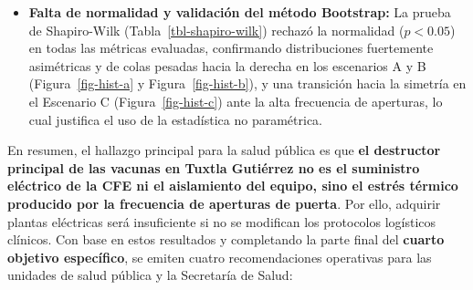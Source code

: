 \documentclass[
  spanish,
  us-letterpaper,
]{scrreprt}
\numberwithin{equation}{section}
\theoremstyle{plain}
\theoremstyle{plain}
\theoremstyle{definition}
\theoremstyle{plain}
\theoremstyle{remark}
\begin{document}
\begin{itemize}
  lineal sino exponencial, multiplicándose por más de cinco veces hasta
  alcanzar \textbf{1,905 dosis destruidas por año (2.57\%)} con un IC al
  \(95\%\) de \([1896, 1913]\text{ dosis}\) (\([2.56\%, 2.58\%]\),
  Tabla~\ref{tbl-riesgo-operativo-bootstrap}, Figura~\ref{fig-boot-c} y
  Figura~\ref{fig-box-boot-c}), produciendo un daño continuo durante
  todo el año sin importar la estación climática
  (Figura~\ref{fig-abanico-c}, Figura~\ref{fig-promedio-c},
  Figura~\ref{fig-mediana-c}, Figura~\ref{fig-hist-c} y
  Figura~\ref{fig-boxplot-c}).
\item
  \textbf{Falta de normalidad y validación del método Bootstrap:} La
  prueba de Shapiro-Wilk (Tabla~\ref{tbl-shapiro-wilk}) rechazó la
  normalidad (\(p < 0.05\)) en todas las métricas evaluadas, confirmando
  distribuciones fuertemente asimétricas y de colas pesadas hacia la
  derecha en los escenarios A y B (Figura~\ref{fig-hist-a} y
  Figura~\ref{fig-hist-b}), y una transición hacia la simetría en el
  Escenario C (Figura~\ref{fig-hist-c}) ante la alta frecuencia de
  aperturas, lo cual justifica el uso de la estadística no paramétrica.
\end{itemize}

En resumen, el hallazgo principal para la salud pública es que
\textbf{el destructor principal de las vacunas en Tuxtla Gutiérrez no es
el suministro eléctrico de la CFE ni el aislamiento del equipo, sino el
estrés térmico producido por la frecuencia de aperturas de puerta}. Por
ello, adquirir plantas eléctricas será insuficiente si no se modifican
los protocolos logísticos clínicos. Con base en estos resultados y
completando la parte final del \textbf{cuarto objetivo específico}, se
emiten cuatro recomendaciones operativas para las unidades de salud
pública y la Secretaría de Salud:
\end{document}
